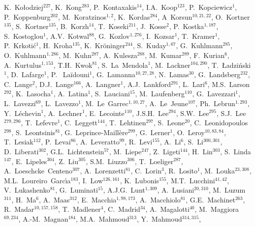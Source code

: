 K.~Ko{\l}odziej$^{{227}}$,
K.~Kong$^{{283}}$,
P.~Kontaxakis$^{{14}}$,
I.A.~Koop$^{{123}}$,
P.~Kopciewicz$^{{1}}$,
P.~Koppenburg$^{{202}}$,
M.~Koratzinos$^{{1, 2}}$,
K.~Kordas$^{{284}}$,
A~Korsun$^{{10, 21, 22}}$,
O.~Kortner$^{{135}}$,
S.~Kortner$^{{135}}$,
B.~Korzh$^{{14}}$,
T.~Koseki$^{{211}}$,
J.~Kosse$^{{2}}$,
P.~Kostka$^{{1, 187}}$,
S.~Kostoglou$^{{1}}$,
A.V.~Kotwal$^{{88}}$,
G.~Kozlov$^{{1, 276}}$,
I.~Kozsar$^{{1}}$,
T.~Kramer$^{{1}}$,
P.~Krkoti{\'c}$^{{1}}$,
H.~Kroha$^{{135}}$,
K.~Kr{\"o}ninger$^{{244}}$,
S.~Kuday$^{{1, 67}}$,
G.~Kuhlmann$^{{285}}$,
O.~Kuhlmann$^{{1, 286}}$,
M.~Kuhn$^{{287}}$,
A.~Kulesza$^{{288}}$,
M.~Kumar$^{{289}}$,
F.~Kurian$^{{6}}$,
A.~Kurtulus$^{{1, 153}}$,
T.H.~Kwok$^{{81}}$,
S.~La~Mendola$^{{1}}$,
M.~Lackner$^{{104, 290}}$,
T.~{\L}adzi{\'n}ski$^{{1}}$,
D.~Lafarge$^{{1}}$,
P. ~La{\"i}douni$^{{1}}$,
G.~Lamanna$^{{10, 27, 28}}$,
N.~Lamas$^{{30}}$,
G.~Landsberg$^{{232}}$,
C.~Lange$^{{2}}$,
D.J.~Lange$^{{166}}$,
A.~Langner$^{{1}}$,
A.J.~Lankford$^{{291}}$,
L.~Lari$^{{6}}$,
M.S.~Larson$^{{292}}$,
K.~Lasocha$^{{1}}$,
A.~Latina$^{{1}}$,
S.~Lauciani$^{{15}}$,
M.~Laufenberg$^{{110}}$,
G.~Lavezzari$^{{1}}$,
L.~Lavezzi$^{{69}}$,
L.~Lavezzo$^{{1}}$,
M.~Le~Garrec$^{{1, 10, 27}}$,
A.~Le~Jeune$^{{107}}$,
Ph.~Lebrun$^{{1, 293}}$,
Y.~L{\'e}chevin$^{{1}}$,
A.~Lechner$^{{1}}$,
E.~Lecointe$^{{110}}$,
J.S.H.~Lee$^{{294}}$,
S.W.~Lee$^{{295}}$,
S.J.~Lee$^{{279, 296}}$,
T.~Lefevre$^{{1}}$,
C.~Leggett$^{{144}}$,
T.~Lehtinen$^{{297}}$,
S.~Leone$^{{20}}$,
C.~Leonidopoulos$^{{298}}$,
S.~Leontsinis$^{{81}}$,
G.~Leprince-Maill{\`e}re$^{{299}}$,
G.~Lerner$^{{1}}$,
O.~Leroy$^{{10, 83, 84}}$,
T.~Lesiak$^{{112}}$,
P.~Levai$^{{86}}$,
A.~Leveratto$^{{99}}$,
R.~Levi$^{{155}}$,
A.~Li$^{{6}}$,
S.~Li$^{{300, 301}}$,
D.~Liberati$^{{302}}$,
G.L.~Lichtenstein$^{{57}}$,
M.~Liepe$^{{247}}$,
Z.~Ligeti$^{{144}}$,
H.~Lin$^{{303}}$,
S.~Linda$^{{147}}$,
E.~Lipeles$^{{304}}$,
Z.~Liu$^{{305}}$,
S.M.~Liuzzo$^{{306}}$,
T.~Loeliger$^{{287}}$,
A.~Loeschcke~Centeno$^{{307}}$,
A.~Lorenzetti$^{{81}}$,
C.~Lorin$^{{3}}$,
R.~Losito$^{{1}}$,
M.~Louka$^{{23, 308}}$,
M.L.~Loureiro~Garc{\'\i}a$^{{183}}$,
I.~Low$^{{126, 161}}$,
K.~Lubonis$^{{155}}$,
M.T.~Lucchini$^{{41, 42}}$,
V.~Lukashenko$^{{81}}$,
G.~Luminati$^{{15}}$,
A.J.G.~Lunt$^{{1, 309}}$,
A.~Lusiani$^{{20, 310}}$,
M.~Luzum$^{{311}}$,
H.~Ma$^{{6}}$,
A.~Maas$^{{312}}$,
E.~Macchia$^{{1, 98, 173}}$,
A.~Macchiolo$^{{81}}$,
G.E.~Machinet$^{{263}}$,
R.~Madar$^{{10, 157, 158}}$,
T.~Madlener$^{{4}}$,
C.~Madrid$^{{34}}$,
A.~Magalotti$^{{40}}$,
M.~Maggiora$^{{69, 234}}$,
A.-M.~Magnan$^{{184}}$,
M.A.~Mahmoud$^{{313}}$,
Y.~Mahmoud$^{{314, 315}}$,
